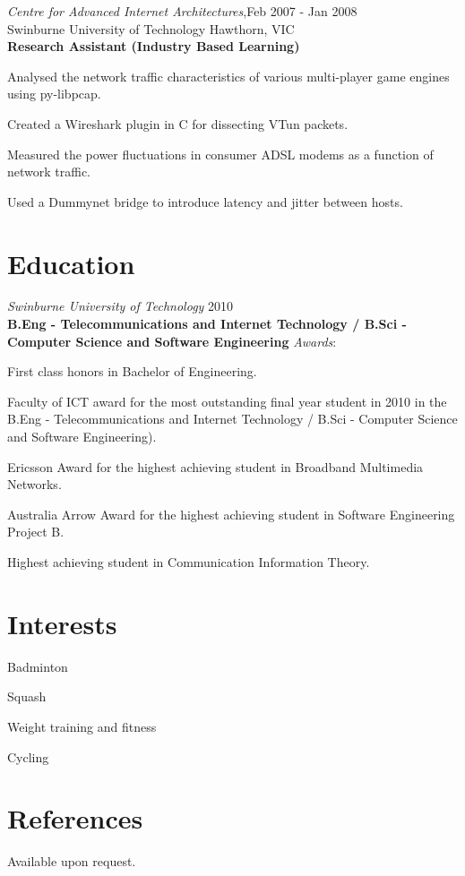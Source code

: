 \documentclass[line,margin]{res}
\begin{document}
\begin{resume}
        \textit{Centre for Advanced Internet Architectures},\hfill Feb 2007 - Jan 2008 \\
        Swinburne University of Technology Hawthorn, VIC \\
        \textbf{Research Assistant (Industry Based Learning)}\\
        \begin{list}{}{\leftmargin=1em \itemsep=-2pt}
            \item{Analysed the network traffic characteristics of various multi-player game engines using
            py-libpcap.}
            \item{Created a Wireshark plugin in C for dissecting VTun packets.}
            \item{Measured the power fluctuations in consumer ADSL modems as a function of network traffic.}
            \item{Used a Dummynet bridge to introduce latency and jitter between hosts.}
        \end{list}

        \section{Education}
        \textit{Swinburne University of Technology} \hfill 2010\\
        \textbf{B.Eng - Telecommunications and Internet Technology / B.Sci - Computer Science and
        Software Engineering}
        \textit{Awards}:
        \begin{list}{}{\leftmargin=1em \itemsep=-2pt}
            \item{First class honors in Bachelor of Engineering.}
            \item{Faculty of ICT award for the most outstanding final year student in 2010 in the B.Eng -
                Telecommunications and Internet Technology / B.Sci - Computer Science and Software
                Engineering).}
            \item{Ericsson Award for the highest achieving student in Broadband Multimedia Networks.}
            \item{Australia Arrow Award for the highest achieving student in Software Engineering Project B.}
            \item{Highest achieving student in Communication Information Theory.}
        \end{list}

        \section{Interests}
        \begin{list}{}{\leftmargin=1em \itemsep=-2pt}
            \item{Badminton}
            \item{Squash}
            \item{Weight training and fitness}
            \item{Cycling}
        \end{list}

        \section{References}
        Available upon request.
    \end{resume}
\end{document}
